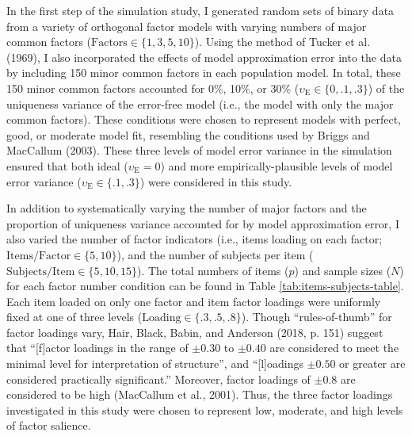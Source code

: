 \documentclass[
  english,
  man]{apa6}
\begin{document}
In the first step of the simulation study, I generated random sets of binary data from a variety of orthogonal factor models with varying numbers of major common factors (\(\textrm{Factors} \in \{1, 3, 5, 10 \}\)). Using the method of Tucker et al. (1969), I also incorporated the effects of model approximation error into the data by including 150 minor common factors in each population model. In total, these 150 minor common factors accounted for 0\%, 10\%, or 30\% (\(\upsilon_{\textrm{E}} \in \{ 0, .1, .3 \}\)) of the uniqueness variance of the error-free model (i.e., the model with only the major common factors). These conditions were chosen to represent models with perfect, good, or moderate model fit, resembling the conditions used by Briggs and MacCallum (2003). These three levels of model error variance in the simulation ensured that both ideal (\(\upsilon_{\textrm{E}} = 0\)) and more empirically-plausible levels of model error variance (\(\upsilon_{\textrm{E}} \in \{ .1, .3\}\)) were considered in this study.

In addition to systematically varying the number of major factors and the proportion of uniqueness variance accounted for by model approximation error, I also varied the number of factor indicators (i.e., items loading on each factor; \(\textrm{Items/Factor} \in \{5, 10 \}\)), and the number of subjects per item (\(\textrm{Subjects/Item} \in \{ 5, 10, 15\}\)). The total numbers of items (\(p\)) and sample sizes (\(N\)) for each factor number condition can be found in Table \ref{tab:items-subjects-table}. Each item loaded on only one factor and item factor loadings were uniformly fixed at one of three levels (\(\textrm{Loading} \in \{ .3, .5, .8 \}\)). Though \enquote{rules-of-thumb} for factor loadings vary, Hair, Black, Babin, and Anderson (2018, p. 151) suggest that \enquote{{[}f{]}actor loadings in the range of \(\pm 0.30\) to \(\pm 0.40\) are considered to meet the minimal level for interpretation of structure}, and \enquote{{[}l{]}oadings \(\pm 0.50\) or greater are considered practically significant.} Moreover, factor loadings of \(\pm 0.8\) are considered to be high (MacCallum et al., 2001). Thus, the three factor loadings investigated in this study were chosen to represent low, moderate, and high levels of factor salience.
\end{document}
